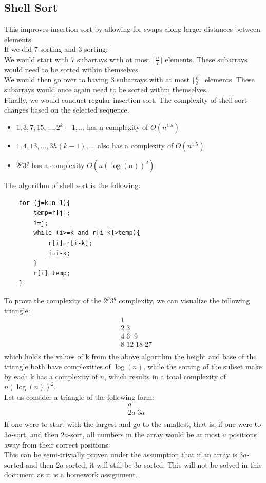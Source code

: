 \documentclass[nobib]{tufte-handout}
\begin{document}
\subsection{Shell Sort}
This improves insertion sort by allowing for swaps along larger distances
between elements.\\ If we did 7-sorting and 3-sorting:\\ We would start with 7
subarrays with at most $\lceil \frac{n}{7} \rceil$ elements. These subarrays
would need to be sorted within themselves.\\ We would then go over to having 3
subarrays with at most $\lceil \frac{n}{3} \rceil$ elements. These subarrays
would once again need to be sorted within themselves.\\ Finally, we would
conduct regular insertion sort. The complexity of shell sort changes based on
the selected sequence.\\
\begin{itemize}
    \item $1,3,7,15, \ldots, 2^k-1, \ldots$ has a complexity of $O(n^{1.5})$
    \item $1,4,13,\ldots, 3h(k-1), \ldots$ also has a complexity of $O(n^{1.5})$
    \item $2^p3^q$ has a complexity $O(n(\log(n))^2)$
\end{itemize}
The algorithm of shell sort is the following:
\begin{lstlisting}
    for (j=k:n-1){
        temp=r[j];
        i=j;
        while (i>=k and r[i-k]>temp){
            r[i]=r[i-k];
            i=i-k;
        }
        r[i]=temp;
    }
\end{lstlisting}
To prove the complexity of the $2^p3^q$ complexity, we can visualize the
following triangle:
\begin{align*}
     & 1             \\
     & 2\;3          \\
     & 4\;6\;\;9     \\
     & 8\;12\;18\;27 \\
\end{align*}
which holds the values of k from the above algorithm the height and base of the triangle both have complexities of $\log(n)$, while the sorting of the subset make by each k has a complexity of $n$, which results in a total complexity of $n(\log(n))^2$.\\
Let us consider a triangle of the following form:
\begin{align*}
     & a      \\
     & 2a\;3a \\
\end{align*}
If one were to start with the largest and go to the smallest, that is, if one were to $3a$-sort, and then $2a$-sort, all numbers in the array would be at most $a$ positions away from their correct positions.\\
This can be semi-trivially proven under the assumption that if an array is $3a$-sorted and then $2a$-sorted, it will still be $3a$-sorted. This will not be solved in this document as it is a homework assignment.\\
\end{document}
